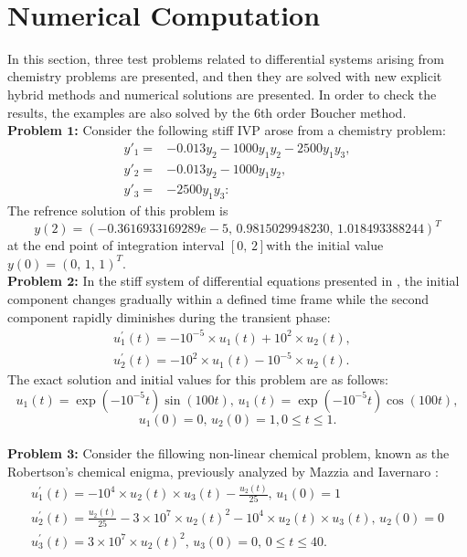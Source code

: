 ‎\documentclass[a4paper,10pt]{article}‎
\begin{document}
\section{\textbf{Numerical Computation}}
\noindent
In this section, three test problems related to differential systems arising from chemistry problems are presented, and then they are solved with new explicit hybrid methods and numerical solutions are presented. In order to check the results, the examples are also solved by the 6th order Boucher method.\\
\noindent
\textbf{Problem $\mathbf{1}$:}
Consider the following stiff  IVP arose from a chemistry problem\cite{ALI5,ALI2,ALI1}:
\begin{align*}\label{}
y'_{1}=& -0.013 y_{2}-1000y_{1}y_{2}-2500y_{1}y_{3},\\
y'_{2}=& -0.013y_{2}-1000y_{1}y_{2},\\
y'_{3}=& -2500y_{1}y_{3}:
\end{align*}
The  refrence solution of this  problem is  $$y(2)=(-0.3616933169289e-5,\, 0.9815029948230, \,1.018493388244)^{T}$$
at the end point of integration interval $[0,\,2]$with the initial value $y(0)=(0,\,1,\,1)^{T}$. 
\vspace{0.2 cm}\\
\noindent
\textbf{Problem $\mathbf{2}$:}
In the stiff system of differential equations presented in \cite{Q24}, the initial component changes gradually within a defined time frame while the second component rapidly diminishes during the transient phase:
\begin{eqnarray*}
u_{1}^{'}(t)= -10^{-5}\times u_{1}(t)+10^{2}\times u_{2}(t),&\\
u_{2}^{'}(t)= -10^{2}\times u_{1}(t)-10^{-5}\times u_{2}(t).
\end{eqnarray*}
The exact solution and initial values for this problem are as follows:
\[u_{1}(t)=\exp( -10^{-5}t)\sin(100t),\,u_{1}(t)=\exp( -10^{-5}t)\cos(100t),\]
\[u_{1}(0)=0,\, u_{2}(0)=1, 0\leq t \leq 1.\]
\vspace{0.2 cm}\\
\noindent
\textbf{Problem $\mathbf{3}$:}
 Consider the fillowing non-linear chemical problem, known as the Robertson’s chemical enigma, previously analyzed by Mazzia and Iavernaro \cite{Q24}:
\begin{eqnarray*}
u_{1}^{'}(t)= -10^{4}\times u_{2}(t)\times u_{3}(t)-\frac{u_{2}(t)}{25},\, u_{1}(0)=1\\
u_{2}^{'}(t)=\frac{u_{2}(t)}{25}-3\times 10^{7}\times u_{2}(t)^{2}-10^{4}\times u_{2}(t)\times u_{3}(t),\, u_{2}(0)=0 \\
u_{3}^{'}(t)=3\times 10^{7}\times u_{2}(t)^{2},\, u_{3}(0)=0,\,  0\leq t \leq 40.
\end{eqnarray*}
\end{document}
